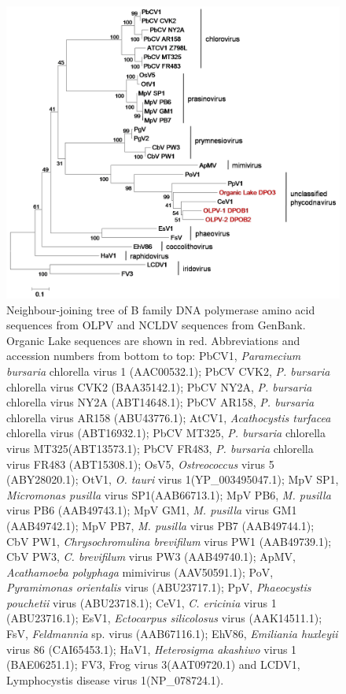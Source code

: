 \begin{figure}
\includegraphics[width=\textwidth]{olv_figures/OLPV_full_dpo.jpg}
\caption[Phylogeny of \ac{OLPV} B family DNA polymerase sequences]{Neighbour-joining tree of B family DNA polymerase amino acid sequences from \ac{OLPV} and \ac{NCLDV} sequences from GenBank. 
Organic Lake sequences are shown in red.
Abbreviations and accession numbers from bottom to top: PbCV1, \emph{Paramecium bursaria} chlorella virus 1 (AAC00532.1); PbCV CVK2, \emph{P. bursaria} chlorella virus CVK2 (BAA35142.1); PbCV NY2A,  \emph{P. bursaria} chlorella virus NY2A (ABT14648.1); PbCV AR158, \emph{P. bursaria} chlorella virus AR158 (ABU43776.1); AtCV1, \emph{Acathocystis turfacea} chlorella virus (ABT16932.1); PbCV MT325,  \emph{P. bursaria} chlorella virus MT325(ABT13573.1); PbCV FR483, \emph{P. bursaria} chlorella virus FR483 (ABT15308.1); OsV5, \emph{Ostreococcus} virus 5 (ABY28020.1); OtV1, \emph{O. tauri} virus 1(YP\_003495047.1);  MpV SP1, \emph{Micromonas pusilla} virus SP1(AAB66713.1); MpV PB6, \emph{M. pusilla} virus PB6 (AAB49743.1); MpV GM1, \emph{M. pusilla} virus GM1 (AAB49742.1); MpV PB7, \emph{M. pusilla} virus PB7 (AAB49744.1); CbV PW1, \emph{Chrysochromulina brevifilum} virus PW1 (AAB49739.1); CbV PW3, \emph{C. brevifilum} virus PW3 (AAB49740.1); ApMV, \emph{Acathamoeba polyphaga} mimivirus (AAV50591.1); PoV,  \emph{Pyramimonas orientalis} virus (ABU23717.1); PpV, \emph{Phaeocystis pouchetii} virus (ABU23718.1); CeV1, \emph{C. ericinia} virus 1 (ABU23716.1); EsV1, \emph{Ectocarpus silicolosus} virus (AAK14511.1); FsV, \emph{Feldmannia} sp. virus (AAB67116.1); EhV86, \emph{Emiliania huxleyii} virus 86 (CAI65453.1); HaV1, \emph{Heterosigma akashiwo} virus 1 (BAE06251.1); FV3, Frog virus 3(AAT09720.1) and LCDV1, Lymphocystis disease virus 1(NP\_078724.1). 
}
\label{fig:OLPV_full_dpo}

\end{figure}
